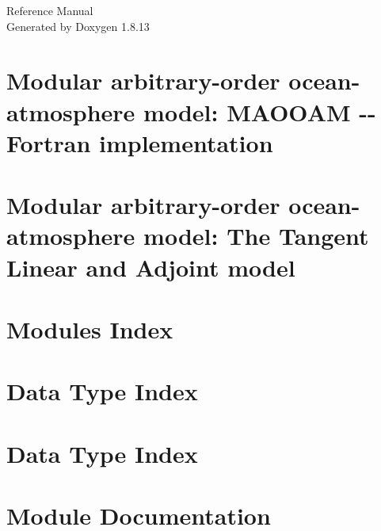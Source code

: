 \documentclass[twoside]{book}
\newcommand{\+}{\discretionary{\mbox{\scriptsize$\hookleftarrow$}}{}{}}
\newcommand{\clearemptydoublepage}{%
  \newpage{\pagestyle{empty}\cleardoublepage}%
}
\begin{document}
\hypersetup{pageanchor=false,
             bookmarksnumbered=true,
             pdfencoding=unicode
            }
\begin{titlepage}
\vspace*{7cm}
\begin{center}%
{\Large Reference Manual}\\
\vspace*{1cm}
{\large Generated by Doxygen 1.8.13}\\
\end{center}
\end{titlepage}
\clearemptydoublepage
{}
\tableofcontents
\clearemptydoublepage
{}
\hypersetup{pageanchor=true}

\chapter{Modular arbitrary-\/order ocean-\/atmosphere model\+: M\+A\+O\+O\+AM -\/-\/ Fortran implementation}
\label{index}\hypertarget{index}{}
\chapter{Modular arbitrary-\/order ocean-\/atmosphere model\+: The Tangent Linear and Adjoint model}
\label{md_doc_tl_ad_doc}

\chapter{Modules Index}

\chapter{Data Type Index}

\chapter{Data Type Index}

\chapter{Module Documentation}















\end{document}
